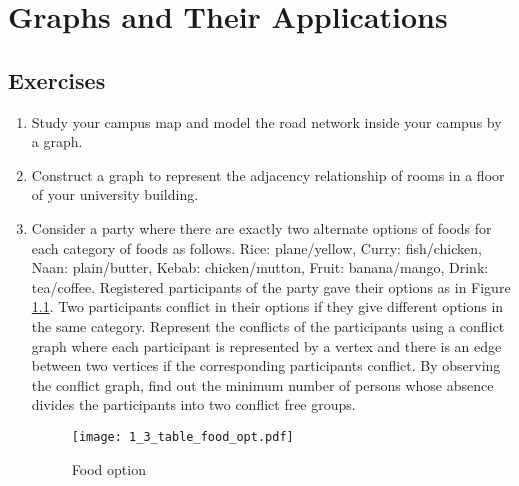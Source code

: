 \chapter{Graphs and Their Applications}\label{ch1}
\section{Exercises}
    \begin{enumerate}[leftmargin=1.5em]
      \item {
        Study your campus map and model the road network inside your campus by a graph.
        
        \begin{description}[leftmargin=0em]
           \item[Answer:] {
                {[}Do it yourself{]}
            }
        \end{description}
      }
      \item {
        Construct a graph to represent the adjacency relationship of rooms in a floor of your university building.
        
      }
      \item {
        Consider a party where there are exactly two alternate options of foods for each category of foods as follows. Rice: plane/yellow, Curry: fish/chicken, Naan: plain/butter, Kebab: chicken/mutton, Fruit: banana/mango, Drink: tea/coffee. Registered participants of the party gave their options as in Figure \ref{fig:1_3_table_food_opt}. Two participants conflict in their options if they give different options in the same category. Represent the conflicts of the participants using a conflict graph where each participant is represented by a vertex and there is an edge between two vertices if the corresponding participants conflict. By observing the conflict graph, find out the minimum number of persons whose absence divides the participants into two conflict free groups.
        \begin{figure}[H]
            \centering
            \texttt{[image: 1\_3\_table\_food\_opt.pdf]}
            \caption{Food option}
            \label{fig:1_3_table_food_opt}
        \end{figure}
        
}
\end{enumerate}
